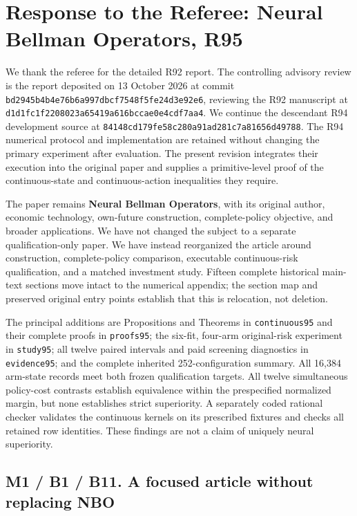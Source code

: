 \hypertarget{response-to-the-referee-neural-bellman-operators-r95}{%
\section{Response to the Referee: Neural Bellman Operators,
R95}\label{response-to-the-referee-neural-bellman-operators-r95}}

We thank the referee for the detailed R92 report. The controlling
advisory review is the report deposited on 13 October 2026 at commit
\texttt{bd2945b4b4e76b6a997dbcf7548f5fe24d3e92e6}, reviewing the R92
manuscript at \texttt{d1d1fc1f2208023a65419a616bccae0e4cdf7aa4}. We
continue the descendant R94 development source at
\texttt{84148cd179fe58c280a91ad281c7a81656d49788}. The R94 numerical
protocol and implementation are retained without changing the primary
experiment after evaluation. The present revision integrates their
execution into the original paper and supplies a primitive-level proof
of the continuous-state and continuous-action inequalities they require.

The paper remains \textbf{Neural Bellman Operators}, with its original
author, economic technology, own-future construction, complete-policy
objective, and broader applications. We have not changed the subject to
a separate qualification-only paper. We have instead reorganized the
article around construction, complete-policy comparison, executable
continuous-risk qualification, and a matched investment study. Fifteen
complete historical main-text sections move intact to the numerical
appendix; the section map and preserved original entry points establish
that this is relocation, not deletion.

The principal additions are Propositions and Theorems in
\texttt{continuous95} and their complete proofs in \texttt{proofs95};
the six-fit, four-arm original-risk experiment in \texttt{study95}; all
twelve paired intervals and paid screening diagnostics in
\texttt{evidence95}; and the complete inherited 252-configuration
summary. All 16,384 arm-state records meet both frozen qualification
targets. All twelve simultaneous policy-cost contrasts establish
equivalence within the prespecified normalized margin, but none
establishes strict superiority. A separately coded rational checker
validates the continuous kernels on its prescribed fixtures and checks
all retained row identities. These findings are not a claim of uniquely
neural superiority.

\hypertarget{m1-b1-b11.-a-focused-article-without-replacing-nbo}{%
\subsection{M1 / B1 / B11. A focused article without replacing
NBO}\label{m1-b1-b11.-a-focused-article-without-replacing-nbo}}

